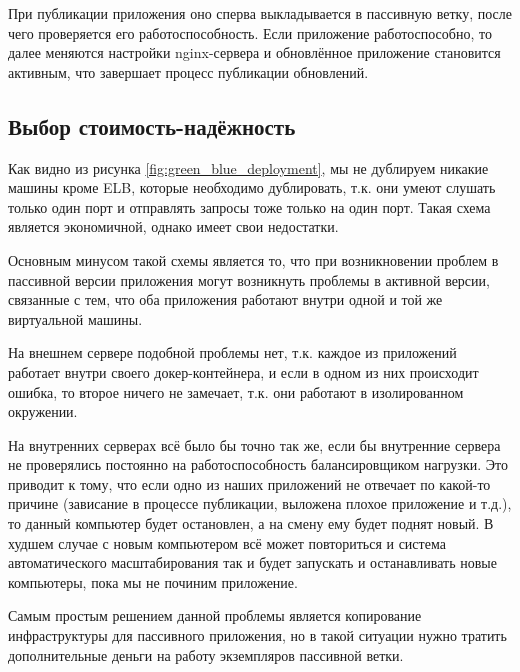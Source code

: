 	При публикации приложения оно сперва выкладывается в пассивную ветку, после чего проверяется его работоспособность. Если приложение работоспособно, то далее меняются настройки nginx-сервера  и обновлённое приложение становится активным, что завершает процесс публикации обновлений.
\subsection{Выбор стоимость-надёжность}
\label{subsec:deployment_choice}
	Как видно из рисунка \ref{fig:green_blue_deployment}, мы не дублируем никакие машины кроме ELB, которые необходимо дублировать, т.к. они умеют слушать только один порт и отправлять запросы тоже только на один порт. Такая схема является экономичной, однако имеет свои недостатки.
	
	Основным минусом такой схемы является то, что при возникновении проблем в пассивной версии приложения могут возникнуть проблемы в активной версии, связанные с тем, что оба приложения работают внутри одной и той же виртуальной машины.
	
	На внешнем сервере подобной проблемы нет, т.к. каждое из приложений работает внутри своего докер-контейнера, и если в одном из них происходит ошибка, то второе ничего не замечает, т.к. они работают в изолированном окружении.
	
	На внутренних серверах всё было бы точно так же, если бы внутренние сервера не проверялись постоянно на работоспособность балансировщиком нагрузки. Это приводит к тому, что если одно из наших приложений не отвечает по какой-то причине (зависание в процессе публикации, выложена плохое приложение и т.д.), то данный компьютер будет остановлен, а на смену ему будет поднят новый. В худшем случае с новым компьютером всё может повториться и система автоматического масштабирования так и будет запускать и останавливать новые компьютеры, пока мы не починим приложение.
	
	Самым простым решением данной проблемы является копирование инфраструктуры для пассивного приложения, но в такой ситуации нужно тратить дополнительные деньги на работу экземпляров пассивной ветки.
